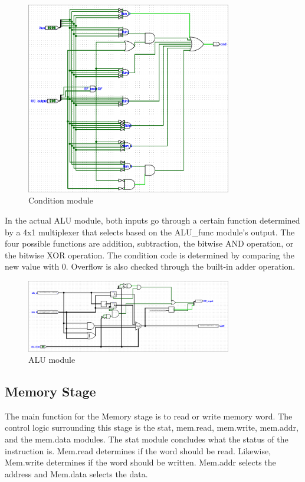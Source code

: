 \documentclass{article}
\begin{document}
\begin{figure}[H]
    \centering
    \includegraphics[width=0.8\textwidth]{./images/cond.png}
    \caption{Condition module}
\end{figure}

In the actual ALU module, both inputs go through a certain function determined by a 4x1 multiplexer that selects based on the ALU\_func module's output. 
The four possible functions are addition, subtraction, the bitwise AND operation, or the bitwise XOR operation. 
The condition code is determined by comparing the new value with 0. 
Overflow is also checked through the built-in adder operation. 

\begin{figure}[H]
    \centering
    \includegraphics[width=0.8\textwidth]{./images/alu.png}
    \caption{ALU module}
\end{figure}

\subsection{Memory Stage}

The main function for the Memory stage is to read or write memory word. 
The control logic surrounding this stage is the stat, mem.read, mem.write, mem.addr, and the mem.data modules. 
The stat module concludes what the status of the instruction is. 
Mem.read determines if the word should be read. 
Likewise, Mem.write determines if the word should be written. 
Mem.addr selects the address and Mem.data selects the data. 
\end{document}
